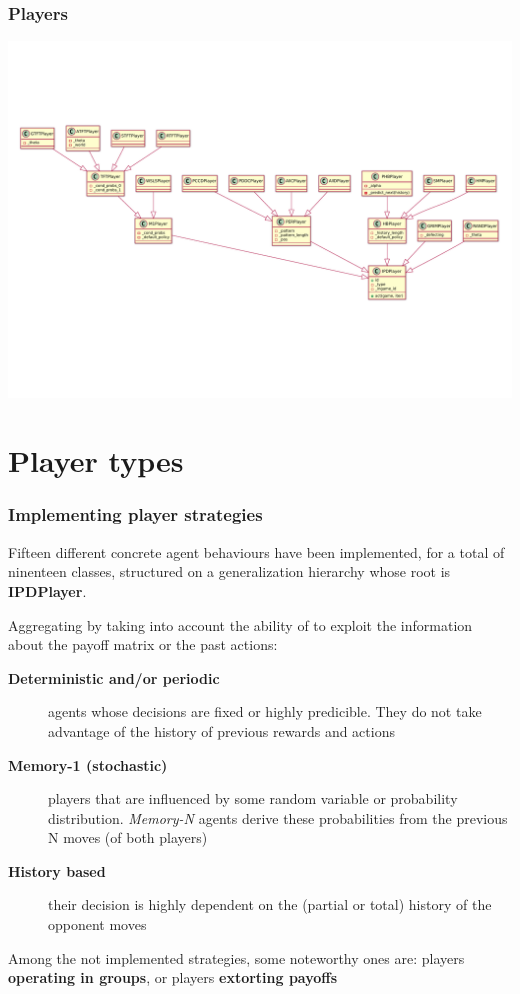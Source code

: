\documentclass[xcolor={usenames,dvipsnames,svgnames}, compress]{beamer}
\begin{document}
\begin{frame}
  \frametitle{Players}
  \begin{center}
    \includegraphics[width=1.0\textwidth]{../uml/all-players.pdf}
  \end{center} 
\end{frame}


\section{Player types}
{
  \begin{frame}
    \sectionpage
  \end{frame}
}

\begin{frame}
  \frametitle{Implementing player strategies}

  Fifteen different concrete agent behaviours have been implemented,
  for a total of ninenteen classes, structured on a generalization
  hierarchy whose root is \textbf{IPDPlayer}.\par\bigskip

  Aggregating by taking into account the ability of to exploit the information about the payoff matrix or the past actions:
  
  \begin{description}
  \item[\textbf{Deterministic and/or periodic}] agents whose decisions
    are fixed or highly predicible.
    They do not take advantage of the history of previous rewards and actions
  \item[\textbf{Memory-1 (stochastic)}] players that are influenced by
    some random variable or probability distribution.
    \emph{Memory-N} agents derive these probabilities from the previous N moves (of both players)
  \item[\textbf{History based}]their decision is highly dependent on the (partial or total) history of the opponent moves
  \end{description}

  Among the not implemented strategies, some noteworthy ones are:
  players \textbf{operating in groups}, or players \textbf{extorting payoffs}
\end{frame}
\end{document}
